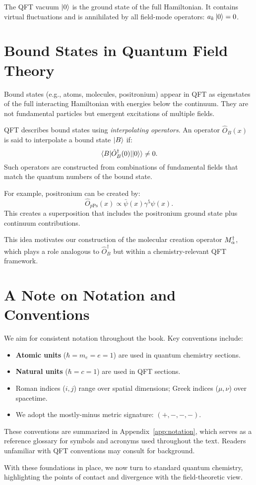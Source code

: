 The QFT vacuum \(\ket{0}\) is the ground state of the full Hamiltonian. It contains virtual fluctuations and is annihilated by all field-mode operators: \(a_{k} \ket{0} = 0\).

\section{Bound States in Quantum Field Theory}
\label{sec:foundations_bound_states}

Bound states (e.g., atoms, molecules, positronium) appear in QFT as eigenstates of the full interacting Hamiltonian with energies below the continuum. They are not fundamental particles but emergent excitations of multiple fields.

QFT describes bound states using \emph{interpolating operators}. An operator \(\hat{O}_B(x)\) is said to interpolate a bound state \(\ket{B}\) if:
\[
\mel{B}{\hat{O}_B^\dagger(0)}{\ket{0}} \neq 0.
\]
Such operators are constructed from combinations of fundamental fields that match the quantum numbers of the bound state.

For example, positronium can be created by:
\[
\hat{O}_{p\text{Ps}}(x) \propto \bar{\psi}(x) \gamma^5 \psi(x).
\]
This creates a superposition that includes the positronium ground state plus continuum contributions.

This idea motivates our construction of the molecular creation operator \(M^\dagger_{\alpha}\), which plays a role analogous to \(\hat{O}_B^\dagger\) but within a chemistry-relevant QFT framework.

\section{A Note on Notation and Conventions}
\label{sec:foundations_notation}

We aim for consistent notation throughout the book. Key conventions include:
\begin{itemize}
	\item \textbf{Atomic units} (\(\hbar = m_e = e = 1\)) are used in quantum chemistry sections.
	\item \textbf{Natural units} (\(\hbar = c = 1\)) are used in QFT sections.
	\item Roman indices (\(i, j\)) range over spatial dimensions; Greek indices (\(\mu, \nu\)) over spacetime.
	\item We adopt the mostly-minus metric signature: \((+,-,-,-)\).
\end{itemize}

These conventions are summarized in Appendix~\ref{app:notation}, which serves as a reference glossary for symbols and acronyms used throughout the text. Readers unfamiliar with QFT conventions may consult \cite{Peskin1995, Srednicki2007, Zee2010} for background.

\bigskip

With these foundations in place, we now turn to standard quantum chemistry, highlighting the points of contact and divergence with the field-theoretic view.


